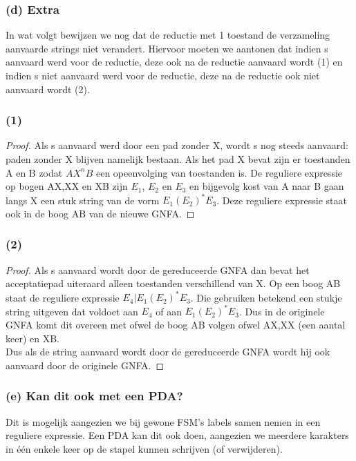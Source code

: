 \subsubsection*{(d) Extra}
In wat volgt bewijzen we nog dat de reductie met 1 toestand de verzameling aanvaarde strings niet verandert. Hiervoor moeten we aantonen dat indien s aanvaard werd voor de reductie, deze ook na de reductie aanvaard wordt (1) en indien s niet aanvaard werd voor de reductie, deze na de reductie ook niet aanvaard wordt (2).\\
\subsubsection*{(1)}
\begin{proof}
Als s aanvaard werd door een pad zonder X, wordt s nog steeds aanvaard: paden zonder X blijven namelijk bestaan. Als het pad X bevat zijn er toestanden A en B zodat $AX^n B$ een opeenvolging van toestanden is. De reguliere expressie op bogen AX,XX en XB zijn $E_1$, $E_2$ en $E_3$ en bijgevolg kost van A naar B gaan langs X een stuk string van de vorm $E_1  (E_2)^* E_3$. Deze reguliere expressie staat ook in de boog AB van de nieuwe GNFA.
\end{proof}
\subsubsection*{(2)}
\begin{proof}
Als s aanvaard wordt door de gereduceerde GNFA dan bevat het acceptatiepad uiteraard alleen toestanden verschillend van X. Op een boog AB staat de reguliere expressie $E_4 | E_1 (E_2)^* E_3$. Die gebruiken betekend een stukje string uitgeven dat voldoet aan $E_4$ of aan $E_1 (E_2)^* E_3$. Dus in de originele GNFA komt dit overeen met ofwel de boog AB volgen ofwel AX,XX (een aantal keer) en XB.\\
Dus als de string aanvaard wordt door de gereduceerde GNFA wordt hij ook aanvaard door de originele GNFA.
\end{proof}

\subsubsection*{(e) Kan dit ook met een PDA?}
Dit is mogelijk aangezien we bij gewone FSM's labels samen nemen in een reguliere expressie. Een PDA kan dit ook doen, aangezien we meerdere karakters in \'e\'en enkele keer op de stapel kunnen schrijven (of verwijderen).
